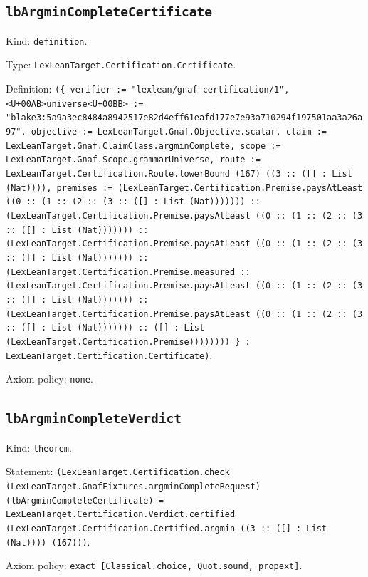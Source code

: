 \documentclass[11pt]{article}
\begin{document}
\subsection*{\texttt{lbArgminCompleteCertificate}}
\noindent Kind: \texttt{definition}.\par
\noindent Type: \texttt{LexLeanTarget.Certification.Certificate}.\par
\noindent Definition: \texttt{(\{ verifier := "lexlean/gnaf-certification/1", <U+00AB>universe<U+00BB> := "blake3:5a9a3ec8484a8942517e82d4eff61eafd177e7e93a710294f197501aa3a26a97", objective := LexLeanTarget.Gnaf.Objective.scalar, claim := LexLeanTarget.Gnaf.ClaimClass.argminComplete, scope := LexLeanTarget.Gnaf.Scope.grammarUniverse, route := LexLeanTarget.Certification.Route.lowerBound (167) ((3 :: ([] : List (Nat)))), premises := (LexLeanTarget.Certification.Premise.paysAtLeast ((0 :: (1 :: (2 :: (3 :: ([] : List (Nat))))))) :: (LexLeanTarget.Certification.Premise.paysAtLeast ((0 :: (1 :: (2 :: (3 :: ([] : List (Nat))))))) :: (LexLeanTarget.Certification.Premise.paysAtLeast ((0 :: (1 :: (2 :: (3 :: ([] : List (Nat))))))) :: (LexLeanTarget.Certification.Premise.measured :: (LexLeanTarget.Certification.Premise.paysAtLeast ((0 :: (1 :: (2 :: (3 :: ([] : List (Nat))))))) :: (LexLeanTarget.Certification.Premise.paysAtLeast ((0 :: (1 :: (2 :: (3 :: ([] : List (Nat))))))) :: ([] : List (LexLeanTarget.Certification.Premise)))))))) \} : LexLeanTarget.Certification.Certificate)}.\par
\noindent Axiom policy: \texttt{none}.\par
\subsection*{\texttt{lbArgminCompleteVerdict}}
\noindent Kind: \texttt{theorem}.\par
\noindent Statement: \texttt{(LexLeanTarget.Certification.check (LexLeanTarget.GnafFixtures.argminCompleteRequest) (lbArgminCompleteCertificate) = LexLeanTarget.Certification.Verdict.certified (LexLeanTarget.Certification.Certified.argmin ((3 :: ([] : List (Nat)))) (167)))}.\par
\noindent Axiom policy: \texttt{exact [Classical.choice, Quot.sound, propext]}.\par
\end{document}
